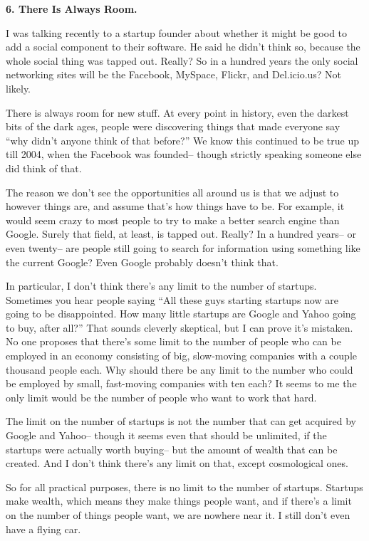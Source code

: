\documentclass[12pt]{book}
\begin{document}
\textbf{6. There Is Always Room.}

I was talking recently to a startup founder about whether it might be
good to add a social component to their software. He said he didn't
think so, because the whole social thing was tapped out. Really? So in a
hundred years the only social networking sites will be the Facebook,
MySpace, Flickr, and Del.icio.us? Not likely.

There is always room for new stuff. At every point in history, even the
darkest bits of the dark ages, people were discovering things that made
everyone say ``why didn't anyone think of that before?'' We know this
continued to be true up till 2004, when the Facebook was founded--
though strictly speaking someone else did think of that.

The reason we don't see the opportunities all around us is that we
adjust to however things are, and assume that's how things have to be.
For example, it would seem crazy to most people to try to make a better
search engine than Google. Surely that field, at least, is tapped out.
Really? In a hundred years-- or even twenty-- are people still going to
search for information using something like the current Google? Even
Google probably doesn't think that.

In particular, I don't think there's any limit to the number of
startups. Sometimes you hear people saying ``All these guys starting
startups now are going to be disappointed. How many little startups are
Google and Yahoo going to buy, after all?'' That sounds cleverly
skeptical, but I can prove it's mistaken. No one proposes that there's
some limit to the number of people who can be employed in an economy
consisting of big, slow-moving companies with a couple thousand people
each. Why should there be any limit to the number who could be employed
by small, fast-moving companies with ten each? It seems to me the only
limit would be the number of people who want to work that hard.

The limit on the number of startups is not the number that can get
acquired by Google and Yahoo-- though it seems even that should be
unlimited, if the startups were actually worth buying-- but the amount
of wealth that can be created. And I don't think there's any limit on
that, except cosmological ones.

So for all practical purposes, there is no limit to the number of
startups. Startups make wealth, which means they make things people
want, and if there's a limit on the number of things people want, we are
nowhere near it. I still don't even have a flying car.
\end{document}
